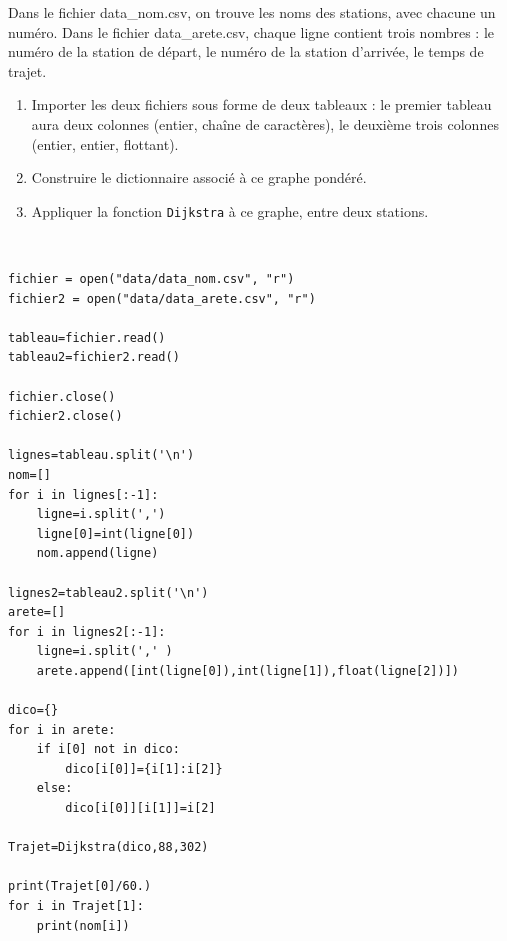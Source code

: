 Dans le fichier data\_nom.csv, on trouve les noms des stations, avec chacune un numéro. Dans le fichier data\_arete.csv, chaque ligne contient trois nombres : le numéro de la station de départ, le numéro de la station d'arrivée, le temps de trajet. 

\begin{exercice}
\begin{enumerate}
\item Importer les deux fichiers sous forme de deux tableaux : le premier tableau aura deux colonnes (entier, chaîne de caractères), le deuxième trois colonnes (entier, entier, flottant).
\item Construire le dictionnaire associé à ce graphe pondéré.
\item Appliquer la fonction \texttt{Dijkstra} à ce graphe, entre deux stations.
\end{enumerate}
\end{exercice}

\begin{solution}~\
\begin{verbatim}
fichier = open("data/data_nom.csv", "r")
fichier2 = open("data/data_arete.csv", "r")

tableau=fichier.read()
tableau2=fichier2.read()

fichier.close()
fichier2.close()

lignes=tableau.split('\n')
nom=[]
for i in lignes[:-1]:
    ligne=i.split(',')
    ligne[0]=int(ligne[0])
    nom.append(ligne)
    
lignes2=tableau2.split('\n')    
arete=[]
for i in lignes2[:-1]:
    ligne=i.split(',' )
    arete.append([int(ligne[0]),int(ligne[1]),float(ligne[2])])
    
dico={}
for i in arete:
    if i[0] not in dico:
        dico[i[0]]={i[1]:i[2]}
    else:
        dico[i[0]][i[1]]=i[2]

Trajet=Dijkstra(dico,88,302)

print(Trajet[0]/60.)
for i in Trajet[1]:
    print(nom[i])
\end{verbatim}
\end{solution}











